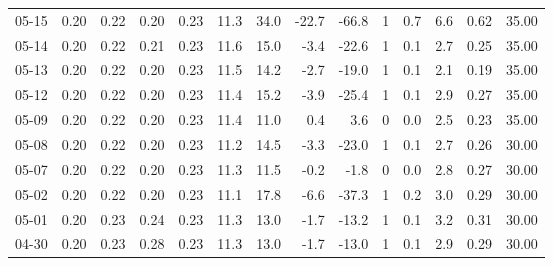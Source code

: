 \begin{threeparttable}
{\begin{tabular}{lrrrrrrrrrrrrr}
  05-15 &          0.20 &          0.22 &          0.20 &        0.23 &                11.3 &                34.0 &      -22.7 &        -66.8 &              1 &                 0.7 &              6.6 &            0.62 &                  35.00 \\
  05-14 &          0.20 &          0.22 &          0.21 &        0.23 &                11.6 &                15.0 &       -3.4 &        -22.6 &              1 &                 0.1 &              2.7 &            0.25 &                  35.00 \\
  05-13 &          0.20 &          0.22 &          0.20 &        0.23 &                11.5 &                14.2 &       -2.7 &        -19.0 &              1 &                 0.1 &              2.1 &            0.19 &                  35.00 \\
  05-12 &          0.20 &          0.22 &          0.20 &        0.23 &                11.4 &                15.2 &       -3.9 &        -25.4 &              1 &                 0.1 &              2.9 &            0.27 &                  35.00 \\
  05-09 &          0.20 &          0.22 &          0.20 &        0.23 &                11.4 &                11.0 &        0.4 &          3.6 &              0 &                 0.0 &              2.5 &            0.23 &                  35.00 \\
  05-08 &          0.20 &          0.22 &          0.20 &        0.23 &                11.2 &                14.5 &       -3.3 &        -23.0 &              1 &                 0.1 &              2.7 &            0.26 &                  30.00 \\
  05-07 &          0.20 &          0.22 &          0.20 &        0.23 &                11.3 &                11.5 &       -0.2 &         -1.8 &              0 &                 0.0 &              2.8 &            0.27 &                  30.00 \\
  05-02 &          0.20 &          0.22 &          0.20 &        0.23 &                11.1 &                17.8 &       -6.6 &        -37.3 &              1 &                 0.2 &              3.0 &            0.29 &                  30.00 \\
  05-01 &          0.20 &          0.23 &          0.24 &        0.23 &                11.3 &                13.0 &       -1.7 &        -13.2 &              1 &                 0.1 &              3.2 &            0.31 &                  30.00 \\
  04-30 &          0.20 &          0.23 &          0.28 &        0.23 &                11.3 &                13.0 &       -1.7 &        -13.0 &              1 &                 0.1 &              2.9 &            0.29 &                  30.00 \\

\end{tabular}}
\end{threeparttable}
